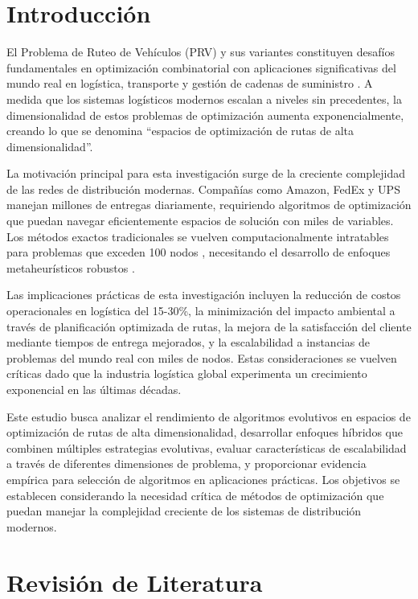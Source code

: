 \documentclass[12pt,a4paper]{article}
\begin{document}
\section{Introducción}

El Problema de Ruteo de Vehículos (PRV) y sus variantes constituyen desafíos fundamentales en optimización combinatorial con aplicaciones significativas del mundo real en logística, transporte y gestión de cadenas de suministro \cite{toth2014,laporte2009}. A medida que los sistemas logísticos modernos escalan a niveles sin precedentes, la dimensionalidad de estos problemas de optimización aumenta exponencialmente, creando lo que se denomina ``espacios de optimización de rutas de alta dimensionalidad''.

La motivación principal para esta investigación surge de la creciente complejidad de las redes de distribución modernas. Compañías como Amazon, FedEx y UPS manejan millones de entregas diariamente, requiriendo algoritmos de optimización que puedan navegar eficientemente espacios de solución con miles de variables. Los métodos exactos tradicionales se vuelven computacionalmente intratables para problemas que exceden 100 nodos \cite{applegate2007}, necesitando el desarrollo de enfoques metaheurísticos robustos \cite{blum2003}.

Las implicaciones prácticas de esta investigación incluyen la reducción de costos operacionales en logística del 15-30\%, la minimización del impacto ambiental a través de planificación optimizada de rutas, la mejora de la satisfacción del cliente mediante tiempos de entrega mejorados, y la escalabilidad a instancias de problemas del mundo real con miles de nodos. Estas consideraciones se vuelven críticas dado que la industria logística global experimenta un crecimiento exponencial en las últimas décadas.

Este estudio busca analizar el rendimiento de algoritmos evolutivos en espacios de optimización de rutas de alta dimensionalidad, desarrollar enfoques híbridos que combinen múltiples estrategias evolutivas, evaluar características de escalabilidad a través de diferentes dimensiones de problema, y proporcionar evidencia empírica para selección de algoritmos en aplicaciones prácticas. Los objetivos se establecen considerando la necesidad crítica de métodos de optimización que puedan manejar la complejidad creciente de los sistemas de distribución modernos.

\section{Revisión de Literatura}
\end{document}
